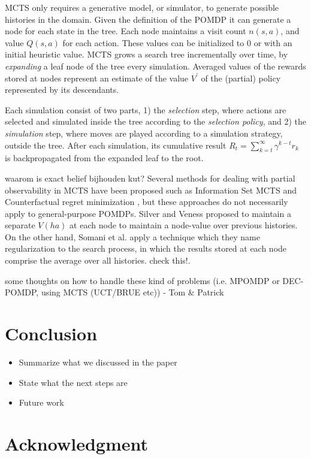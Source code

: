 \documentclass[conference]{IEEEtran}
\begin{document}
MCTS only requires a generative model, or simulator, to generate possible histories in the domain. Given the definition of the POMDP it can generate a node for each state in the tree. Each node maintains a visit count $n(s, a)$, and value $Q(s, a)$ for each action. These values can be initialized to $0$ or with an initial heuristic value. MCTS grows a search tree incrementally over time, by \emph{expanding} a leaf node of the tree every simulation. Averaged values of the rewards stored at nodes represent an estimate of the value $V^{\prime}$ of the (partial) policy represented by its descendants.

Each simulation consist of two parts, 1) the \emph{selection} step, where actions are selected and simulated inside the tree according to the {\it selection policy}, and 2) the \emph{simulation} step, where moves are played according to a simulation strategy, outside the tree. After each simulation, its cumulative result $R_t = \sum\nolimits_{k=t}^{\infty} \gamma^{k−t}r_k$ is backpropagated from the expanded leaf to the root.

{\red waarom is exact belief bijhouden kut?}
Several methods for dealing with partial observability in MCTS have been proposed such as Information Set MCTS and Counterfactual regret minimization \cite{cowling2012information,Lisy15Online}, but these approaches do not necessarily apply to general-purpose POMDPs. Silver and Veness \cite{silver2010monte} proposed to maintain a separate $V(ha)$ at each node to maintain a node-value over previous histories. On the other hand, Somani et al. \cite{somani2013despot} apply a technique which they name regularization to the search process, in which the results stored at each node comprise the average over all histories. {\red check this!}.

{\red some thoughts on how to handle these kind of problems (i.e. MPOMDP or DEC-POMDP, using MCTS (UCT/BRUE etc)) - Tom \& Patrick}

\section{Conclusion}
\begin{itemize}
\item Summarize what we discussed in the paper
\item State what the next steps are
\item Future work
\end{itemize}

\section*{Acknowledgment}




\end{document}
